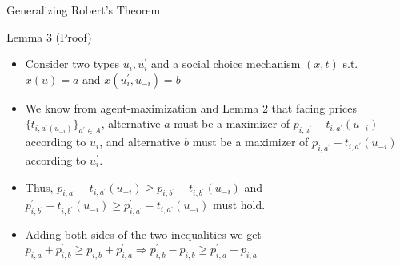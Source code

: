 \begin{frame}{Generalizing Robert's Theorem}
\begin{block}{Lemma 3 (Proof)}
\begin{itemize}
    \item Consider two types $u_{i},u_{i}^{'}$ and a social choice mechanism $(x, t)$ s.t. $x(u)=a$ and $x(u_{i}^{'},u_{-i}) = b$
    \item We know from agent-maximization and Lemma 2 that facing prices $\{t_{i,a^{'}(u_{-i})}\}_{a^{'}\in A}$, alternative $a$ must be a maximizer of $p_{i,a^{'}} - t_{i,a^{'}}(u_{-i})$ according to $u_{i}$, and alternative $b$ must be a maximizer of $p_{i,a^{'}} - t_{i,a^{'}}(u_{-i})$ according to $u_{i}^{'}$.
    \item Thus, $p_{i,a^{'}} - t_{i,a^{'}}(u_{-i}) \geq p_{i,b^{'}} - t_{i,b^{'}}(u_{-i})$ and $p_{i,b^{'}}^{'} - t_{i,b^{'}}(u_{-i}) \geq p_{i,a^{'}}^{'} - t_{i,a^{'}}(u_{-i})$ must hold.
    \item Adding both sides of the two inequalities we get $p_{i,a}+p_{i,b}^{'} \geq p_{i,b} + p_{i,a}^{'} \Rightarrow p_{i,b}^{'} - p_{i,b} \geq p_{i,a}^{'} - p_{i,a}$
    
\end{itemize}
\end{block}
\end{frame}
